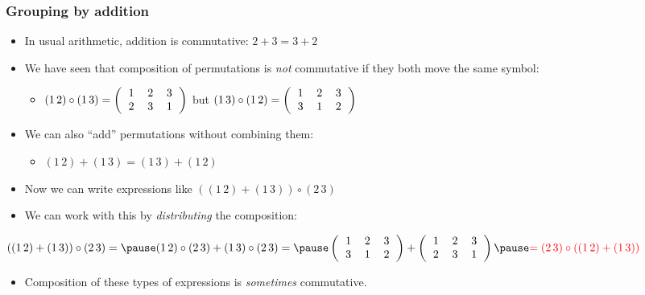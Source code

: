 \documentclass{beamer}
\begin{document}
\begin{frame}
\frametitle{Grouping by addition}
\begin{itemize}
\item In usual arithmetic, addition is commutative: \pause $2+3=3+2$ \pause
\item We have seen that composition of permutations is \emph{not}
  commutative if they both move the same symbol:\pause
\begin{itemize}
\item $(1\,2)\circ(1\,3)=\left(\begin{tabular}{ccc}1 & 2 & 3\\ 2 & 3 &
      1\end{tabular}\right)$ but $(1\,3)\circ(1\,2)=\left(\begin{tabular}{ccc}1 & 2 & 3\\ 3 & 1 &
      2\end{tabular}\right)$ \pause
\end{itemize}
\item We can also ``add'' permutations without combining them: \pause
\begin{itemize}
\item  $(1\,2)+(1\,3)=(1\,3)+(1\,2)$
\pause
\end{itemize}
\item Now we can write expressions like
  $\left((1\,2)+(1\,3)\right)\circ(2\,3) $ \pause
\item We can work with this by \emph{distributing} the composition:
\end{itemize}
$((1\,2)+(1\,3))\circ(2\,3) = \pause (1\,2)\circ(2\,3) +
(1\,3)\circ(2\,3) = \pause \left(\begin{tabular}{ccc}1 & 2 & 3\\ 3 & 1 &
      2\end{tabular}\right) + \left(\begin{tabular}{ccc}1 & 2 & 3\\ 2 & 3 &
      1\end{tabular}\right) \pause \textcolor{red}{=
    (2\,3)\circ((1\,2)+(1\,3))}$
\begin{itemize}
\item Composition of these types of expressions is \emph{sometimes} commutative. 
\end{itemize}
\end{frame}
\end{document}
